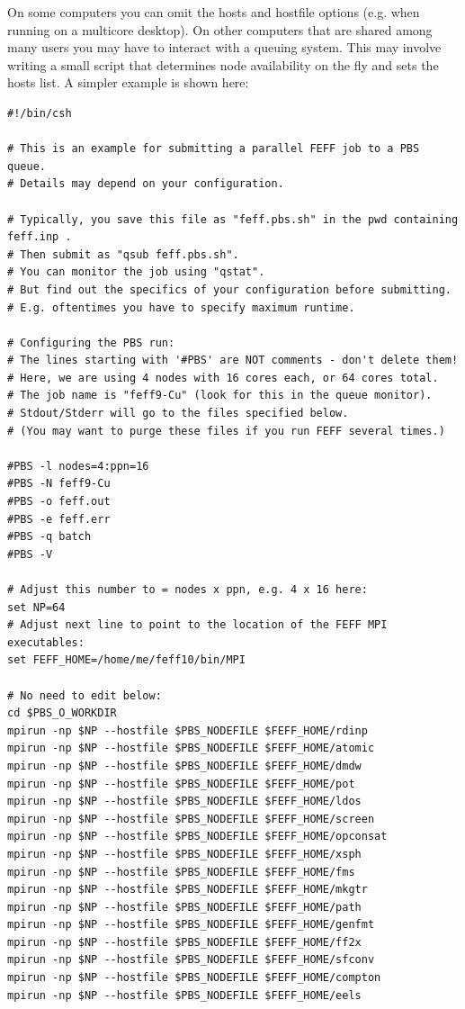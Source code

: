 \documentclass[11pt,oneside]{report} %
\begin{document}
On some computers you can omit the hosts and hostfile options (e.g. when running on a multicore desktop).  On other computers that are shared among many users you may have to interact with a queuing system.  This may involve writing a small script that determines node availability on the fly and sets the hosts list.  A simpler example is shown here:

\begin{verbatim}
#!/bin/csh

# This is an example for submitting a parallel FEFF job to a PBS queue.
# Details may depend on your configuration.

# Typically, you save this file as "feff.pbs.sh" in the pwd containing feff.inp .
# Then submit as "qsub feff.pbs.sh".
# You can monitor the job using "qstat".
# But find out the specifics of your configuration before submitting.
# E.g. oftentimes you have to specify maximum runtime.

# Configuring the PBS run:
# The lines starting with '#PBS' are NOT comments - don't delete them!
# Here, we are using 4 nodes with 16 cores each, or 64 cores total.
# The job name is "feff9-Cu" (look for this in the queue monitor).
# Stdout/Stderr will go to the files specified below.
# (You may want to purge these files if you run FEFF several times.)

#PBS -l nodes=4:ppn=16
#PBS -N feff9-Cu
#PBS -o feff.out
#PBS -e feff.err
#PBS -q batch
#PBS -V

# Adjust this number to = nodes x ppn, e.g. 4 x 16 here:
set NP=64
# Adjust next line to point to the location of the FEFF MPI executables: 
set FEFF_HOME=/home/me/feff10/bin/MPI

# No need to edit below:
cd $PBS_O_WORKDIR
mpirun -np $NP --hostfile $PBS_NODEFILE $FEFF_HOME/rdinp 
mpirun -np $NP --hostfile $PBS_NODEFILE $FEFF_HOME/atomic 
mpirun -np $NP --hostfile $PBS_NODEFILE $FEFF_HOME/dmdw 
mpirun -np $NP --hostfile $PBS_NODEFILE $FEFF_HOME/pot  
mpirun -np $NP --hostfile $PBS_NODEFILE $FEFF_HOME/ldos  
mpirun -np $NP --hostfile $PBS_NODEFILE $FEFF_HOME/screen 
mpirun -np $NP --hostfile $PBS_NODEFILE $FEFF_HOME/opconsat 
mpirun -np $NP --hostfile $PBS_NODEFILE $FEFF_HOME/xsph 
mpirun -np $NP --hostfile $PBS_NODEFILE $FEFF_HOME/fms   
mpirun -np $NP --hostfile $PBS_NODEFILE $FEFF_HOME/mkgtr 
mpirun -np $NP --hostfile $PBS_NODEFILE $FEFF_HOME/path  
mpirun -np $NP --hostfile $PBS_NODEFILE $FEFF_HOME/genfmt 
mpirun -np $NP --hostfile $PBS_NODEFILE $FEFF_HOME/ff2x  
mpirun -np $NP --hostfile $PBS_NODEFILE $FEFF_HOME/sfconv 
mpirun -np $NP --hostfile $PBS_NODEFILE $FEFF_HOME/compton 
mpirun -np $NP --hostfile $PBS_NODEFILE $FEFF_HOME/eels 
\end{verbatim}
\end{document}
